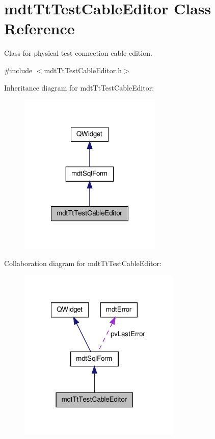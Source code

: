 \hypertarget{classmdt_tt_test_cable_editor}{\section{mdt\-Tt\-Test\-Cable\-Editor Class Reference}
\label{classmdt_tt_test_cable_editor}
}


Class for physical test connection cable edition.  




{\ttfamily \#include $<$mdt\-Tt\-Test\-Cable\-Editor.\-h$>$}



Inheritance diagram for mdt\-Tt\-Test\-Cable\-Editor\-:
\nopagebreak
\begin{figure}[H]
\begin{center}
\leavevmode
\includegraphics[width=192pt]{classmdt_tt_test_cable_editor__inherit__graph}
\end{center}
\end{figure}


Collaboration diagram for mdt\-Tt\-Test\-Cable\-Editor\-:
\nopagebreak
\begin{figure}[H]
\begin{center}
\leavevmode
\includegraphics[width=218pt]{classmdt_tt_test_cable_editor__coll__graph}
\end{center}
\end{figure}
